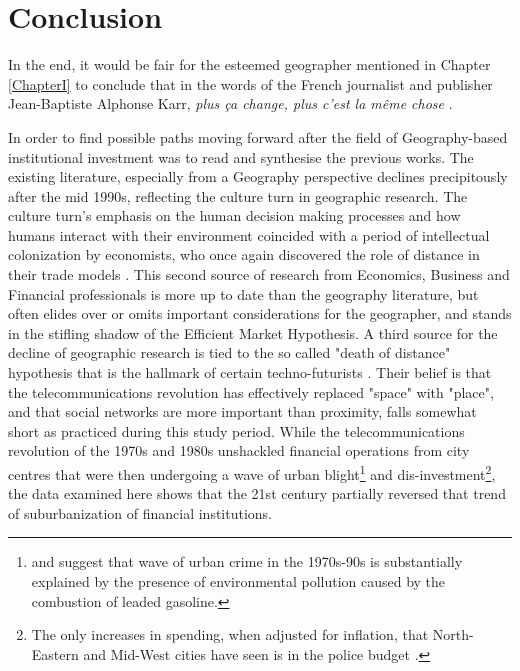\chapter {Conclusion}
In the end, it would be fair for the esteemed geographer mentioned in Chapter \ref{ChapterI} to conclude that in the words of the French journalist and publisher Jean-Baptiste Alphonse Karr, \textit{plus \c{c}a change, plus c'est la m\^{e}me chose} \citep[p.278]{Karr1864}.

In order to find possible paths moving forward after the field of Geography-based institutional investment was to read and synthesise the previous works.  The existing literature, especially from a Geography perspective declines precipitously after the mid 1990s, reflecting the culture turn in geographic research.  The culture turn's emphasis on the human decision making processes and how humans interact with their environment coincided with a period of intellectual colonization by economists, who once again discovered the role of distance in their trade models \citep{scotta2004}.  This second source of research from Economics, Business and Financial professionals is more up to date than the geography literature, but often elides over or omits important considerations for the geographer, and stands in the stifling shadow of the Efficient Market Hypothesis.  A third source for the decline of geographic research is tied to the so called "death of distance" hypothesis that is the hallmark of certain techno-futurists \citep{Obrian1992}.  Their belief is that the telecommunications revolution has effectively replaced "space" with "place", and that social networks are more important than proximity, falls somewhat short as practiced during this study period.  While the telecommunications revolution of the 1970s and 1980s unshackled financial operations from city centres that were then undergoing a wave of urban blight\footnote{ \cite{feigenbaum2016lead} and \cite{NBERw23392} suggest that wave of urban crime in the 1970s-90s is substantially explained by the presence of environmental pollution caused by the combustion of leaded gasoline.}  and dis-investment\footnote{The only increases in spending, when adjusted for inflation, that North-Eastern and Mid-West cities have seen is in the police budget \citep{derenoncourt2019can}.}, the data examined here shows that the 21st century partially reversed that trend of suburbanization of financial institutions.   


